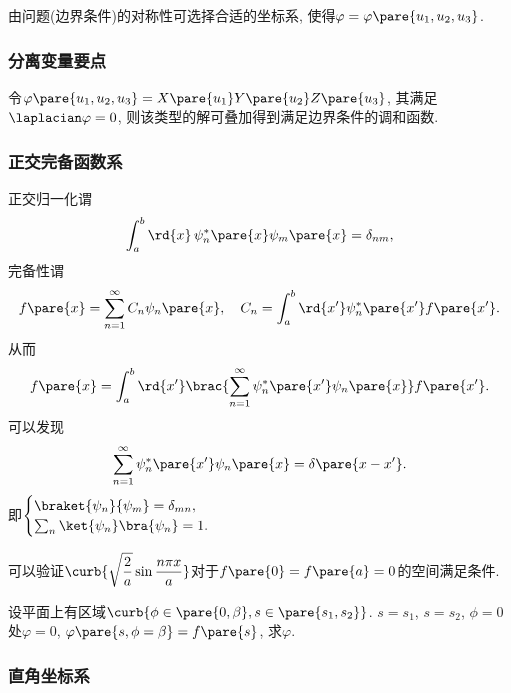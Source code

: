 \documentclass[hidelinks]{ctexart}
\begin{document}
由问题(边界条件)的对称性可选择合适的坐标系, 使得$\varphi = \varphi\pare{u_1,u_2,u_3}$.


\subsubsection{分离变量要点} %
\label{ssub:分离变量要点}

令$\varphi\pare{u_1,u_2,u_3} = X\pare{u_1}Y\pare{u_2}Z\pare{u_3}$, 其满足$\laplacian\varphi = 0$, 则该类型的解可叠加得到满足边界条件的调和函数.


\subsubsection{正交完备函数系} %
\label{ssub:正交完备函数系}

正交归一化谓
\[ \int_a^b \rd{x}\, \psi^*_n\pare{x} \psi_m\pare{x} = \delta_{nm}, \]
完备性谓
\[ f\pare{x} = \sum_{n=1}^\infty C_n\psi_n\pare{x},\quad C_n = \int_a^b\rd{x'} \psi_n^*\pare{x'} f\pare{x'}. \]
从而
\[ f\pare{x} = \int_a^b \rd{x'} \brac{\sum_{n=1}^\infty \psi_n^*\pare{x'}\psi_n\pare{x}}f\pare{x'}. \]
可以发现
\[ \sum_{n=1}^\infty \psi_n^*\pare{x'}\psi_n\pare{x} = \delta\pare{x-x'}. \]
即$\displaystyle \begin{cases}
    \braket{\psi_n}{\psi_m} = \delta_{mn}, \\
    \sum_n \ket{\psi_n}\bra{\psi_n} = 1.
\end{cases}$
\begin{ex}
    可以验证$\displaystyle \curb{\sqrt{\frac{2}{a}}\sin \frac{n\pi x}{a}}$对于$f\pare{0} = f\pare{a} = 0$的空间满足条件.
\end{ex}
\begin{ex}
    设平面上有区域$\curb{\phi\in\pare{0,\beta},s\in\pare{s_1,s_2}}$. $s=s_1$, $s=s_2$, $\phi = 0$处$\varphi = 0$, $\varphi\pare{s,\phi = \beta} = f\pare{s}$, 求$\varphi$.
\end{ex}


\subsubsection{直角坐标系} %
\label{ssub:直角坐标系}
\end{document}
